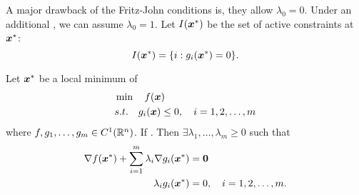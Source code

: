 \documentclass[10pt,a4paper]{article}
\begin{document}
A major drawback of the Fritz-John conditions is, they allow $\lambda_0=0$. Under an additional , we can assume $\lambda_0=1$. Let $I({\boldsymbol x}^*)$ be the set of active constraints at ${\boldsymbol x}^*$: 
\begin{equation*}
	I({\boldsymbol x}^*)=\{i:g_i({\boldsymbol x}^*)=0\}.
\end{equation*}
\begin{thmbox}
	\begin{theorem}\label{thm:KKT-ineq_constrained}
		Let ${\boldsymbol x}^*$ be a local minimum of 
		\begin{align*}
		&\min\quad f({\boldsymbol x})\\
		&s.t.\quad g_i({\boldsymbol x})\leq0,\quad i=1,2,\ldots,m
		\end{align*}
		where $f,g_1,\ldots,g_m\in C^1(\mathbb R^n)$. If . Then $\exists \lambda_1,\ldots,\lambda_m\geq 0$ such that  
		\begin{align*}
			\nabla f({\boldsymbol x}^*)+\sum_{i=1}^m\lambda_i\nabla g_i({\boldsymbol x}^*)& ={\boldsymbol 0} \\
			\lambda_ig_i({\boldsymbol x}^*)& =0, \quad i=1,2,\ldots,m.
		\end{align*} 
	\end{theorem}	
\end{thmbox}
\end{document}
